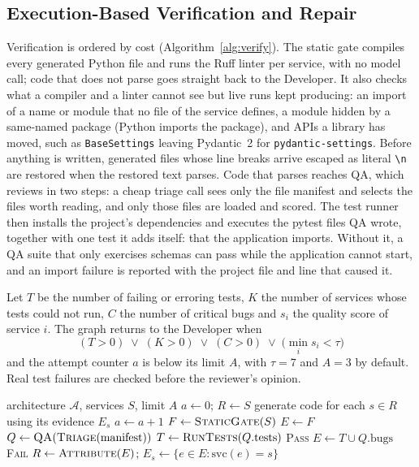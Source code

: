 \documentclass[conference,letterpaper]{IEEEtran}
\begin{document}
\subsection{Execution-Based Verification and Repair}
\label{sec:verification}
Verification is ordered by cost (Algorithm~\ref{alg:verify}). The static gate
compiles every generated Python file and runs the Ruff linter per service, with
no model call; code that does not parse goes straight back to the Developer. It
also checks what a compiler and a linter cannot see but live runs kept
producing: an import of a name or module that no file of the service defines, a
module hidden by a same-named package (Python imports the package), and APIs a
library has moved, such as \texttt{BaseSettings} leaving Pydantic~2 for
\texttt{pydantic-settings}. Before anything is written, generated files whose
line breaks arrive escaped as literal \texttt{\textbackslash n} are restored when
the restored text parses.
Code that parses reaches QA, which reviews in two steps: a cheap triage call
sees only the file manifest and selects the files worth reading, and only those
files are loaded and scored. The test runner then installs the project's
dependencies and executes the pytest files QA wrote, together with one test it
adds itself: that the application imports. Without it, a QA suite that only
exercises schemas can pass while the application cannot start, and an import
failure is reported with the project file and line that caused it.

Let $T$ be the number of failing or erroring tests, $K$ the number of services
whose tests could not run, $C$ the number of critical bugs and $s_i$ the quality
score of service $i$. The graph returns to the Developer when
\begin{equation}
(T>0)\;\lor\;(K>0)\;\lor\;(C>0)\;\lor\;\bigl(\min_i s_i<\tau\bigr)
\label{eq:retry}
\end{equation}
and the attempt counter $a$ is below its limit $A$, with $\tau=7$ and $A=3$ by
default. Real test failures are checked before the reviewer's opinion.

\begin{algorithm}[t]
\caption{Cost-ordered verification and surgical repair}
\label{alg:verify}
\small
\begin{algorithmic}[1]
\Require architecture $\mathcal{A}$, services $S$, limit $A$
\State $a \gets 0$;\; $R \gets S$ 
\Loop
  \State generate code for each $s\in R$ using its evidence $E_s$
  \State $a \gets a+1$
  \State $F \gets \textsc{StaticGate}(S)$ 
     \State $E \gets F$
  \Else
     \State $Q \gets \textsc{QA}(\textsc{Triage}(\text{manifest}))$
     \State $T \gets \textsc{RunTests}(Q.\text{tests})$ 
      \Return \textsc{Pass}
     \EndIf
     \State $E \gets T \cup Q.\text{bugs}$
  \EndIf
   \Return \textsc{Fail} \EndIf
  \State $R \gets \textsc{Attribute}(E)$;\; $E_s \gets \{e\in E : \text{svc}(e)=s\}$
\EndLoop
\end{algorithmic}
\end{algorithm}
\end{document}
